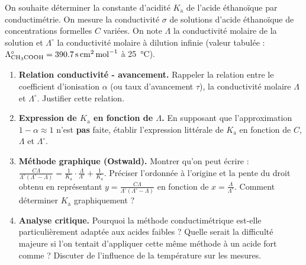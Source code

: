 \documentclass[11pt]{article}
\begin{document}
\begin{exercice}
On souhaite déterminer la constante d'acidité $K_{\mathrm{a}}$ de l'acide éthanoïque par conductimétrie. On mesure la conductivité $\sigma$ de solutions d'acide éthanoïque de concentrations formelles $C$ variées. On note $\Lambda$ la conductivité molaire de la solution et $\Lambda^{\circ}$ la conductivité molaire à dilution infinie (valeur tabulée : $\Lambda^{\circ}_{\ce{CH3COOH}} = \SI{390,7}{\s\centi\meter\squared\per\mole}$ à \SI{25}{\celsius}).

\begin{enumerate}
    \item \textbf{Relation conductivité - avancement.} Rappeler la relation entre le coefficient d'ionisation $\alpha$ (ou taux d'avancement $\tau$), la conductivité molaire $\Lambda$ et $\Lambda^{\circ}$. Justifier cette relation.
    \item \textbf{Expression de $K_{\mathrm{a}}$ en fonction de $\Lambda$.} En supposant que l'approximation $1-\alpha \approx 1$ n'est \textbf{pas} faite, établir l'expression littérale de $K_{\mathrm{a}}$ en fonction de $C$, $\Lambda$ et $\Lambda^{\circ}$.
    \item \textbf{Méthode graphique (Ostwald).} Montrer qu'on peut écrire : $\frac{C \Lambda}{\Lambda^{\circ}(\Lambda^{\circ} - \Lambda)} = \frac{1}{K_{\mathrm{a}}} \cdot \frac{\Lambda}{\Lambda^{\circ}} + \frac{1}{K_{\mathrm{a}}}$. Préciser l'ordonnée à l'origine et la pente du droit obtenu en représentant $y = \frac{C \Lambda}{\Lambda^{\circ}(\Lambda^{\circ} - \Lambda)}$ en fonction de $x = \frac{\Lambda}{\Lambda^{\circ}}$. Comment déterminer $K_{\mathrm{a}}$ graphiquement ?
    \item \textbf{Analyse critique.} Pourquoi la méthode conductimétrique est-elle particulièrement adaptée aux acides faibles ? Quelle serait la difficulté majeure si l'on tentait d'appliquer cette même méthode à un acide fort comme  ? Discuter de l'influence de la température sur les mesures.
\end{enumerate}
\end{exercice}
\end{document}
